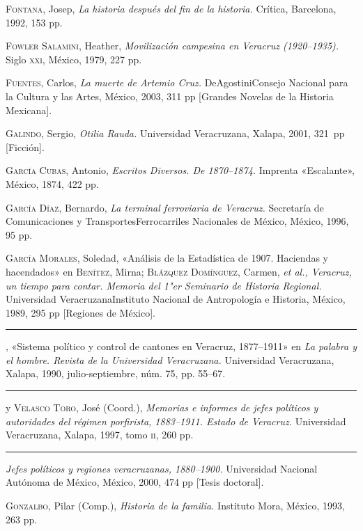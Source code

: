 \documentclass[14pt,twoside,final]{extbook} %
\begin{document}
\textsc{Fontana}, Josep, \emph{La historia después del fin de la historia.} Crítica, Barcelona, 1992, 153 pp.

\textsc{Fowler Salamini}, Heather, \emph{Movilización campesina en Veracruz (1920--1935).} Siglo \textsc{xxi}, México, 1979, 227 pp.

\textsc{Fuentes}, Carlos, \emph{La muerte de Artemio Cruz.} DeAgostini Consejo Nacional para la Cultura y las Artes, México, 2003, 311 pp [Grandes Novelas de la Historia Mexicana].

\textsc{Galindo}, Sergio, \emph{Otilia Rauda.} Universidad Veracruzana, Xalapa, 2001, 321~pp [Ficción].

\textsc{García Cubas}, Antonio, \emph{Escritos Diversos. De 1870--1874.} Imprenta «Escalante», México, 1874, 422 pp.\pagebreak[4]

\textsc{García Díaz}, Bernardo, \emph{La terminal ferroviaria de Veracruz.} Secretaría de Comunicaciones y Transportes Ferrocarriles Nacionales de México, México, 1996, 95 pp.

\textsc{García Morales}, Soledad, «Análisis de la Estadística de 1907. Haciendas y hacendados» en \textsc{Benítez}, Mirna; \textsc{Blázquez Domínguez}, Carmen, \emph{et al., Veracruz, un tiempo para contar. Memoria del 1"er Seminario de Historia Regional.} Universidad Veracruzana Instituto Nacional de Antropología e Historia, México, 1989, 295 pp [Regiones de México].

\rule{1cm}{0.4pt}, «Sistema político y control de cantones en Veracruz, 1877--1911» en \emph{La palabra y el hombre. Revista de la Universidad Veracruzana.} Universidad Veracruzana, Xalapa, 1990, julio-septiembre, núm. 75, pp. 55--67.

\rule{1cm}{0.4pt} y \textsc{Velasco Toro}, José (Coord.), \emph{Memorias e informes de jefes políticos y autoridades del régimen porfirista, 1883--1911. Estado de Veracruz.} Universidad Veracruzana, Xalapa, 1997, tomo \textsc{ii}, 260 pp.

\rule{1cm}{0.4pt} \emph{Jefes políticos y regiones veracruzanas, 1880--1900.} Universidad Nacional Autónoma de México, México, 2000, 474 pp [Tesis doctoral].

\textsc{Gonzalbo}, Pilar (Comp.), \emph{Historia de la familia.} Instituto Mora, México, 1993, 263 pp.
\end{document}
